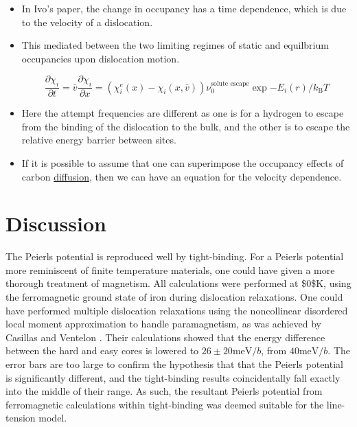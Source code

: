 \documentclass[a4paper,12pt,oneside,print,numbered,index,PageStyleIII]{PhDThesisPSnPDF}
\begin{document}
\begin{enumerate}
\begin{itemize}
\item In Ivo's paper, the change in occupancy has a time dependence,
which is due to the velocity of a dislocation.
\item This mediated between the two limiting regimes of static and
equilbrium occupancies upon dislocation motion.

\[ \frac{\partial \chi_i}{\partial t} = \bar{v}\frac{\partial
       \chi_i}{\partial x} = \left( \chi_i^e(x) - \chi_i(x,\bar{v})
       \right) \nu_0^{\text{solute escape}} \exp{ - E_i(r) / k_{\text{B}} T} \]

\item Here the attempt frequencies are different as one is for a
hydrogen to escape from the binding of the dislocation to the
bulk, and the other is to escape the relative energy barrier
between sites.

\item If it is possible to assume that one can superimpose the
occupancy effects of carbon \uline{diffusion}, then we can have an
equation for the velocity dependence.
\end{itemize}
\end{enumerate}



\section{Discussion}
\label{sec:org03ba825}
\label{sec:discussion}





The Peierls potential is reproduced well by tight-binding. For a Peierls potential more
reminiscent of finite temperature materials, one could have given a more thorough treatment of
magnetism. All calculations were performed at \$0\textdegree{}\$K, using the ferromagnetic ground state of
iron during dislocation relaxations. One could have performed multiple dislocation relaxations
using the noncollinear disordered local moment approximation to handle paramagnetism, as was
achieved by Casillas and Ventelon \cite{Casillas-Trujillo2020}. Their calculations showed that the
energy difference between the hard and easy cores is lowered to \(26 \pm 20\text{meV/}b\), from
\(40 \text{meV/}b\). The error bars are too large to confirm the hypothesis that that the Peierls
potential is significantly different, and the tight-binding results coincidentally fall exactly
into the middle of their range. As such, the resultant Peierls potential from ferromagnetic
calculations within tight-binding was deemed suitable for the line-tension model.
\end{document}
